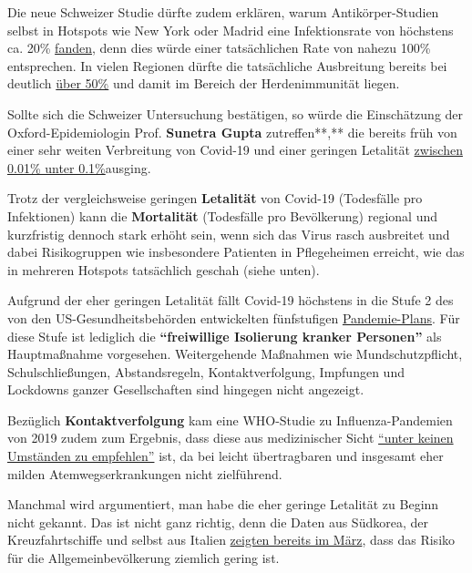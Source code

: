 Die neue Schweizer Studie dürfte zudem erklären, warum
Antikörper-Studien selbst in Hotspots wie New York oder Madrid eine
Infektionsrate von höchstens ca. 20\%
\href{https://www.governor.ny.gov/news/amid-ongoing-covid-19-pandemic-governor-cuomo-announces-results-completed-antibody-testing}{fanden},
denn dies würde einer tatsächlichen Rate von nahezu 100\% entsprechen.
In vielen Regionen dürfte die tatsächliche Ausbreitung bereits bei
deutlich \href{https://swprs.org/studies-on-covid-19-lethality/}{über
50\%} und damit im Bereich der Herdenimmunität liegen.

Sollte sich die Schweizer Untersuchung bestätigen, so würde die
Einschätzung der Oxford-Epidemiologin Prof. \textbf{Sunetra Gupta}
zutreffen**,** die bereits früh von einer sehr weiten Verbreitung von
Covid-19 und einer geringen Letalität
\href{https://unherd.com/2020/05/oxford-doubles-down-sunetra-gupta-interview/}{zwischen
0.01\% unter 0.1\%}ausging.

Trotz der vergleichsweise geringen \textbf{Letalität} von Covid-19
(Todesfälle pro Infektionen) kann die \textbf{Mortalität} (Todesfälle
pro Bevölkerung) regional und kurzfristig dennoch stark erhöht sein,
wenn sich das Virus rasch ausbreitet und dabei Risikogruppen wie
insbesondere Patienten in Pflegeheimen erreicht, wie das in mehreren
Hotspots tatsächlich geschah (siehe unten).

Aufgrund der eher geringen Letalität fällt Covid-19 höchstens in die
Stufe 2 des von den US-Gesundheitsbehörden entwickelten fünfstufigen
\href{https://www.cidrap.umn.edu/news-perspective/2007/02/hhs-ties-pandemic-mitigation-advice-severity}{Pandemie-Plans}.
Für diese Stufe ist lediglich die \textbf{``freiwillige Isolierung
kranker Personen''} als Hauptmaßnahme vorgesehen. Weitergehende
Maßnahmen wie Mundschutzpflicht, Schulschließungen, Abstandsregeln,
Kontaktverfolgung, Impfungen und Lockdowns ganzer Gesellschaften sind
hingegen nicht angezeigt.

Bezüglich \textbf{Kontaktverfolgung} kam eine WHO-Studie zu
Influenza-Pandemien von 2019 zudem zum Ergebnis, dass diese aus
medizinischer Sicht
\href{https://apps.who.int/iris/bitstream/handle/10665/329438/9789241516839-eng.pdf\#page=9}{``unter
keinen Umständen zu empfehlen''} ist, da bei leicht übertragbaren und
insgesamt eher milden Atemwegs­erkrankungen nicht zielführend.

Manchmal wird argumentiert, man habe die eher geringe Letalität zu
Beginn nicht gekannt. Das ist nicht ganz richtig, denn die Daten aus
Südkorea, der Kreuzfahrtschiffe und selbst aus Italien
\href{https://www.statnews.com/2020/03/17/a-fiasco-in-the-making-as-the-coronavirus-pandemic-takes-hold-we-are-making-decisions-without-reliable-data/}{zeigten
bereits im März}, dass das Risiko für die Allgemeinbevölkerung ziemlich
gering ist.

